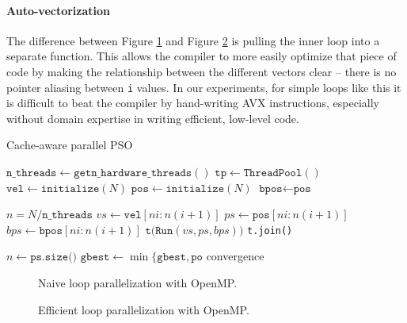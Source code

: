 \paragraph{Auto-vectorization}
The difference between Figure \ref{fig:naive-par} and Figure
\ref{fig:efficient-par} is pulling the inner loop into a separate function. This
allows the compiler to more easily optimize that piece of code by making the
relationship between the different vectors clear -- there is no pointer aliasing
between \texttt{i} values. In our experiments, for simple loops like this it is
difficult to beat the compiler by hand-writing AVX instructions, especially
without domain expertise in writing efficient, low-level code.

\begin{algorithm}
  \caption{Cache-aware parallel PSO}\label{alg:par-pso}
  \begin{algorithmic}[1]
    \State $\texttt{n\_threads} \gets \texttt{getn\_hardware\_threads}()$
    \State $\texttt{tp} \gets \texttt{ThreadPool}()$
    \State $\texttt{vel} \gets \texttt{initialize}(N)$
    \State $\texttt{pos} \gets \texttt{initialize}(N)$
    \State $\texttt{bpos} \gets \texttt{pos}$

    \State $n = N/\texttt{n\_threads}$ 
    \State $vs \gets \texttt{vel}[ni:n(i+1)]$
    \State $ps \gets \texttt{pos}[ni:n(i+1)]$
    \State $bps \gets \texttt{bpos}[ni:n(i+1)]$
    \State $\texttt{t(Run}(vs, ps, bps))$
    \EndFor
    \State \texttt{t.join()}
    \EndFor
    \EndProcedure
  \end{algorithmic}
  \begin{algorithmic}[1]
    \State $n \gets \texttt{ps.size()}$
    \Repeat
    \State $\texttt{gbest} \gets \min\{\texttt{gbest}, \texttt{po}$
    \EndFor
    \State 
    \EndFor
    \Until convergence
    \EndProcedure
  \end{algorithmic}
\end{algorithm}

\begin{figure}
  
  \caption{Naive loop parallelization with OpenMP.}\label{fig:naive-par}
\end{figure}

\begin{figure}
  
  \caption{Efficient loop parallelization with OpenMP.}\label{fig:efficient-par}
\end{figure}

